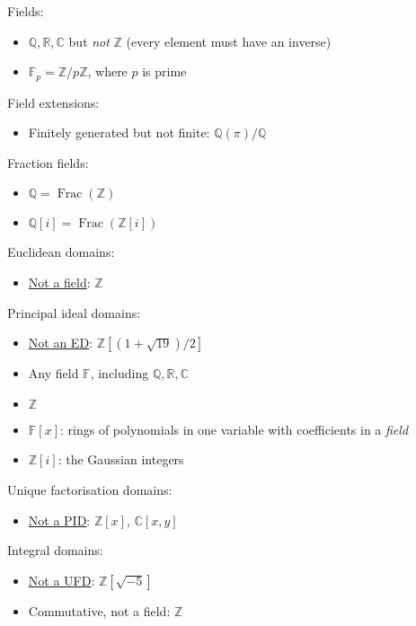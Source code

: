 Fields:
    \begin{itemize}
        \item $\mathbb{Q}, \mathbb{R}, \mathbb{C}$ but \textit{not} $\mathbb{Z}$ (every element must have an inverse)
        \item $\mathbb{F}_p = \mathbb{Z}/p\mathbb{Z}$, where $p$ is prime
    \end{itemize}
    
Field extensions:
    \begin{itemize}
        \item Finitely generated but not finite: $\mathbb{Q}(\pi)/\mathbb{Q}$
    \end{itemize}
    
Fraction fields:
    \begin{itemize}
        \item $\mathbb{Q} = \operatorname{Frac}(\mathbb{Z})$
        \item $\mathbb{Q}[i] = \operatorname{Frac}(\mathbb{Z}[i])$
    \end{itemize}

Euclidean domains:
    \begin{itemize}
        \item \underline{Not a field}: $\mathbb{Z}$
    \end{itemize}

Principal ideal domains:
    \begin{itemize}
        \item \underline{Not an ED}: $\mathbb{Z}[(1 + \sqrt{19}) / 2]$
        \item Any field $\mathbb{F}$, including $\mathbb{Q}, \mathbb{R}, \mathbb{C}$
        \item $\mathbb{Z}$
        \item $\mathbb{F}[x]$: rings of polynomials in one variable with coefficients in a \textit{field}
        \item $\mathbb{Z}[i]$: the Gaussian integers
    \end{itemize}
    
Unique factorisation domains:
    \begin{itemize}
        \item \underline{Not a PID}: $\mathbb{Z}[x]$, $\mathbb{C}[x, y]$
    \end{itemize}
    
Integral domains:
    \begin{itemize}
        \item \underline{Not a UFD}: $\mathbb{Z}[\sqrt{-5}]$
        \item Commutative, not a field: $\mathbb{Z}$
    \end{itemize}
    
